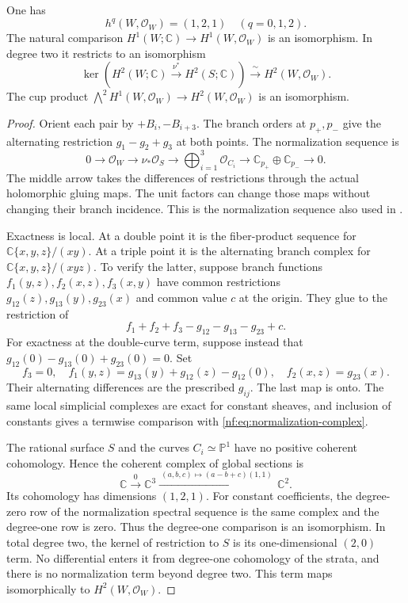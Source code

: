 \begin{lemma}\label{nf:lem:cusp-coherent}
One has
\[
 h^q(W,\mathcal O_W)=(1,2,1)\quad(q=0,1,2).
\]
The natural comparison $H^1(W;\mathbb C)\to H^1(W,\mathcal O_W)$
is an isomorphism. In degree two it restricts to an isomorphism
\[
 \ker\!\left(H^2(W;\mathbb C)\xrightarrow{\nu^*}
                  H^2(S;\mathbb C)\right)
       \xrightarrow{\ \sim\ }H^2(W,\mathcal O_W).
\]
The cup product
$\bigwedge^2H^1(W,\mathcal O_W)\to H^2(W,\mathcal O_W)$
is an isomorphism.
\end{lemma}

\begin{proof}
Orient each pair by $+B_i,-B_{i+3}$. The branch orders at $p_+,p_-$
give the alternating restriction $g_1-g_2+g_3$ at both points.
The normalization sequence is
\begin{equation}\label{nf:eq:normalization-complex}
 0\longrightarrow\mathcal O_W
 \longrightarrow\nu_*\mathcal O_S
 \longrightarrow\bigoplus_{i=1}^3\mathcal O_{C_i}
 \longrightarrow\mathbb C_{p_+}\oplus\mathbb C_{p_-}
 \longrightarrow0.
\end{equation}
The middle arrow takes the differences of restrictions through
the actual holomorphic gluing maps. The unit factors can change
those maps without changing their branch incidence.
This is the normalization sequence also used in
\cite[Lemma~9.12]{TorusConstruction}.

Exactness is local. At a double point it is the fiber-product
sequence for $\mathbb C\{x,y,z\}/(xy)$. At a triple point it is
the alternating branch complex for
$\mathbb C\{x,y,z\}/(xyz)$. To verify the latter, suppose branch
functions $f_1(y,z),f_2(x,z),f_3(x,y)$ have common restrictions
$g_{12}(z),g_{13}(y),g_{23}(x)$ and common value $c$ at the origin.
They glue to the restriction of
\[
 f_1+f_2+f_3-g_{12}-g_{13}-g_{23}+c.
\]
For exactness at the double-curve term, suppose instead that
$g_{12}(0)-g_{13}(0)+g_{23}(0)=0$. Set
\[
 f_3=0,\quad
 f_1(y,z)=g_{13}(y)+g_{12}(z)-g_{12}(0),\quad
 f_2(x,z)=g_{23}(x).
\]
Their alternating differences are the prescribed $g_{ij}$.
The last map is onto. The same local simplicial complexes are
exact for constant sheaves, and inclusion of constants gives a
termwise comparison with \eqref{nf:eq:normalization-complex}.

The rational surface $S$ and the curves $C_i\simeq\mathbb P^1$
have no positive coherent cohomology. Hence the coherent complex
of global sections is
\begin{equation}\label{nf:eq:cusp-constants}
 \mathbb C\xrightarrow{\ 0\ }\mathbb C^3
 \xrightarrow{\ (a,b,c)\mapsto(a-b+c)(1,1)\ }\mathbb C^2.
\end{equation}
Its cohomology has dimensions $(1,2,1)$.
For constant coefficients, the degree-zero row of the
normalization spectral sequence is the same complex and the
degree-one row is zero. Thus the degree-one comparison is an
isomorphism. In total degree two, the kernel of restriction to
$S$ is its one-dimensional $(2,0)$ term. No differential enters
it from degree-one cohomology of the strata, and there is no
normalization term beyond degree two. This term maps
isomorphically to $H^2(W,\mathcal O_W)$.


\end{proof}
